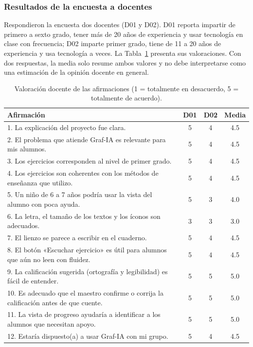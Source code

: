 \subsubsection{Resultados de la encuesta a docentes}
\label{sec:resultados-docentes}

Respondieron la encuesta dos docentes (D01 y D02). D01 reporta impartir de primero a sexto grado, tener más de 20 años de experiencia y usar tecnología en clase con frecuencia; D02 imparte primer grado, tiene de 11 a 20 años de experiencia y usa tecnología a veces. La Tabla~\ref{tab:resultados-docentes} presenta sus valoraciones. Con dos respuestas, la media solo resume ambos valores y no debe interpretarse como una estimación de la opinión docente en general.

\begin{table}[H]
\centering
\caption{Valoración docente de las afirmaciones (1 = totalmente en desacuerdo, 5 = totalmente de acuerdo).}
\label{tab:resultados-docentes}
\renewcommand{\arraystretch}{1.3}
\begin{tabular}{|p{9.6cm}|c|c|c|}
\hline
\textbf{Afirmación} & \textbf{D01} & \textbf{D02} & \textbf{Media} \\ \hline
1. La explicación del proyecto fue clara. & 5 & 4 & 4.5 \\ \hline
2. El problema que atiende Graf-IA es relevante para mis alumnos. & 5 & 4 & 4.5 \\ \hline
3. Los ejercicios corresponden al nivel de primer grado. & 5 & 4 & 4.5 \\ \hline
4. Los ejercicios son coherentes con los métodos de enseñanza que utilizo. & 5 & 4 & 4.5 \\ \hline
5. Un niño de 6 a 7 años podría usar la vista del alumno con poca ayuda. & 5 & 3 & 4.0 \\ \hline
6. La letra, el tamaño de los textos y los íconos son adecuados. & 3 & 3 & 3.0 \\ \hline
7. El lienzo se parece a escribir en el cuaderno. & 5 & 4 & 4.5 \\ \hline
8. El botón «Escuchar ejercicio» es útil para alumnos que aún no leen con fluidez. & 5 & 4 & 4.5 \\ \hline
9. La calificación sugerida (ortografía y legibilidad) es fácil de entender. & 5 & 5 & 5.0 \\ \hline
10. Es adecuado que el maestro confirme o corrija la calificación antes de que cuente. & 5 & 5 & 5.0 \\ \hline
11. La vista de progreso ayudaría a identificar a los alumnos que necesitan apoyo. & 5 & 5 & 5.0 \\ \hline
12. Estaría dispuesto(a) a usar Graf-IA con mi grupo. & 5 & 4 & 4.5 \\ \hline
\end{tabular}
\end{table}

